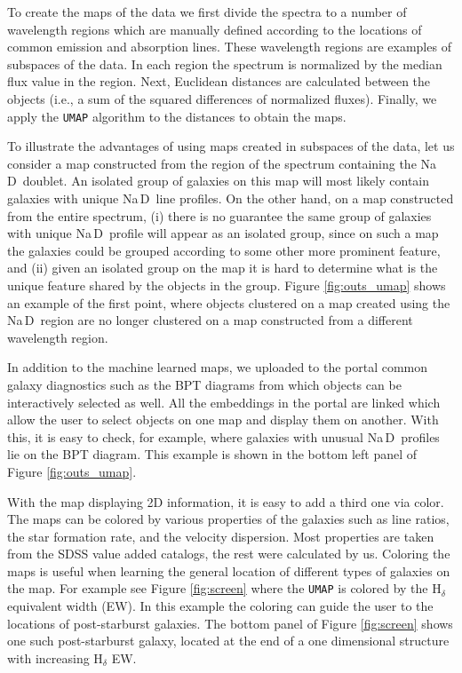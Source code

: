 \documentclass[fleqn,usenatbib]{mnras}
\def\nad{\mbox{Na\hspace{.5pt}{I}\,D}}
\begin{document}
{To create the maps of the data we first divide the spectra to a number of wavelength regions which are manually defined according  to the locations of common emission and absorption lines.  These wavelength regions  are examples of subspaces of the data. In each region the spectrum is normalized by the median flux value in the region. Next, Euclidean distances are calculated between the objects (i.e., a sum of the squared differences of normalized fluxes). Finally, we apply the \texttt{UMAP} algorithm to the distances to obtain the maps. 

To illustrate the advantages of using maps created in subspaces of the data, let us consider a map constructed from the region of the spectrum containing the \nad\ doublet. An isolated group of galaxies on this map will most likely contain galaxies with unique \nad\ line profiles. On the other hand, on a map constructed from the entire spectrum, (i) there is no guarantee the same group of galaxies with unique \nad\ profile will appear as an isolated group, since on such a map the galaxies could be grouped according to some other more prominent feature, and (ii) given an isolated group on the map it is hard to determine what is the unique feature shared by the objects in the group. Figure \ref{fig:outs_umap} shows an example of the first point, where objects clustered on a map created using the \nad\ region are no longer clustered on a map constructed from a different wavelength region.


In addition to the machine learned maps, we uploaded to the portal common galaxy diagnostics such as the  BPT diagrams \citep{bpt} from which objects can be interactively selected as well. All the embeddings in the portal are linked which allow the user to select objects on one map and display them on another. With this, it is easy to check, for example, where galaxies with unusual \nad\  profiles lie on the BPT diagram. This example is shown in the bottom left panel of Figure \ref{fig:outs_umap}. 

With the map displaying 2D information, it is easy to add a third one via color. The maps can be colored by various properties of the galaxies such as line ratios,   the star formation rate, and  the velocity dispersion. Most properties are taken from the SDSS value added catalogs, the rest were calculated by us. Coloring the maps is useful when learning the general location of different types of galaxies on the map. For example see Figure \ref{fig:screen} where the \texttt{UMAP} is colored by the H$_{\delta}$ equivalent width (EW). In this example the coloring can guide the user to the locations of post-starburst galaxies. The bottom panel of Figure \ref{fig:screen} shows one such post-starburst galaxy, located at the end of a one dimensional structure with increasing H$_{\delta}$ EW.

}
\end{document}
